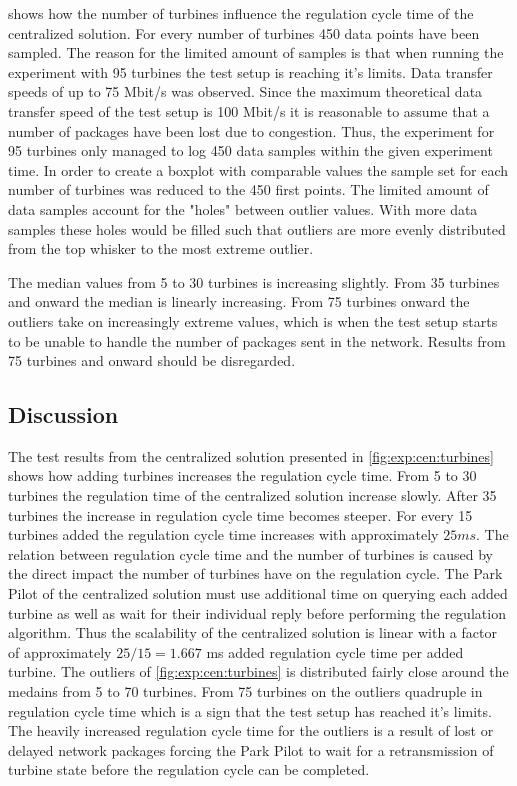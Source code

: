  shows how the number of turbines influence the regulation cycle time of the centralized solution.
For every number of turbines 450 data points have been sampled. The reason for the limited amount of samples is that when running the experiment with 95 turbines the test setup is reaching it's limits. Data transfer speeds of up to 75 Mbit/s was observed. Since the maximum theoretical data transfer speed of the test setup is 100 Mbit/s it is reasonable to assume that a number of packages have been lost due to congestion. Thus, the experiment for 95 turbines only managed to log 450 data samples within the given experiment time. In order to create a boxplot with comparable values the sample set for each number of turbines was reduced to the 450 first points.
The limited amount of data samples account for the "holes" between outlier values. With more data samples these holes would be filled such that outliers are more evenly distributed from the top whisker to the most extreme outlier.

The median values from 5 to 30 turbines is increasing slightly. From 35 turbines and onward the median is linearly increasing.
From 75 turbines onward the outliers take on increasingly extreme values, which is when the test setup starts to be unable to handle the number of packages sent in the network. Results from 75 turbines and onward should be disregarded.

\subsection{Discussion}
The test results from the centralized solution presented in \cref{fig:exp:cen:turbines} shows how adding turbines increases the regulation cycle time. From 5 to 30 turbines the regulation time of the centralized solution increase slowly. After 35 turbines the increase in regulation cycle time becomes steeper. For every 15 turbines added the regulation cycle time increases with approximately $25 ms$. The relation between regulation cycle time and the number of turbines is caused by the direct impact the number of turbines have on the regulation cycle. The Park Pilot of the centralized solution must use additional time on querying each added turbine as well as wait for their individual reply before performing the regulation algorithm. Thus the scalability of the centralized solution is linear with a factor of approximately $25 / 15 = 1.667$ ms added regulation cycle time per added turbine.
The outliers of \cref{fig:exp:cen:turbines} is distributed fairly close around the medains from 5 to 70 turbines. From 75 turbines on the outliers quadruple in regulation cycle time which is a sign that the test setup has reached it's limits. The heavily increased regulation cycle time for the outliers is a result of lost or delayed network packages forcing the Park Pilot to wait for a retransmission of turbine state before the regulation cycle can be completed.

